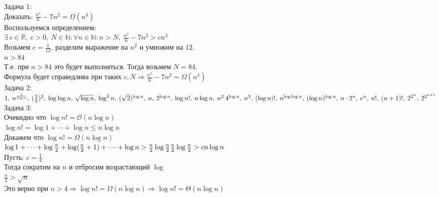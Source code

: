 \documentclass[a4paper, 11pt]{article}
\begin{document}
\quad\quad Задача 1:\\
Доказать: $\frac{n^3}{6} - 7n^2 = \Omega(n^3)$\\
Воспользуемся определением:\\
$\exists\medspace c \in \mathbb{R},\medspace c > 0,\medspace N \in \mathbb{N}: \forall n \in \mathbb{N}: n > N,\medspace\frac{n^3}{6} - 7n^2 > cn^3$\\
Возьмем $c = \frac{1}{12}$, разделим выражение на $n^2$ и умножим на $12$.\\
$n > 84$\\
Т.е. при $n > 84$ это будет выполняться. Тогда возьмем $N = 84$.\\
Формула будет справедлива при таких $c, N \Rightarrow \frac{n^3}{6} - 7n^2 = \Omega(n^3)$ 
\\

\quad\quad Задача 2:\\
$
1, \medspace n^\frac{1}{\log{n}}, \medspace (\frac{3}{2})^2, \medspace \log{\log{n}}, \medspace \sqrt{\log{n}}, \medspace \log^2{n}, \medspace (\sqrt{2})^{\log{n}}, \medspace n, \medspace 2^{\log{n}}, \medspace \log{n!}, \medspace n\log{n}, \medspace n^2\\ \medspace 4^{\log{n}}, \medspace n^3, \medspace (\log{n})!, \medspace n^{\log{\log{n}}}, \medspace (\log{n})^{\log{n}}, \medspace n\cdot2^n, \medspace e^n, \medspace n!, \medspace (n + 1)!, \medspace 2^{2^n}, \medspace 2^{2^{n + 1}}
$
\\

\quad\quad Задача 3:\\
Очевидно что $\log{n!} = \mathcal{O}(n\log{n})$\\
$\log{n!} = \log{1} + \cdots + \log{n} \leqslant n\log{n}$\\
Докажем что $\log{n!} = \Omega(n\log{n})$\\
$\log{1} + \cdots + \log{\frac{n}{2}} + \log(\frac{n}{2} + 1) + \cdots +
\log{n} > \frac{n}{2}\log{\frac{n}{2}}\\
\frac{n}{2}\log{\frac{n}{2}} > cn\log{n}$\\
Пусть: $c = \frac{1}{4}$\\
Тогда сократим на $n$ и отбросим возрастающий $\log$\\$\frac{n}{2} > \sqrt{n}$\\
Это верно при $n > 4 \Rightarrow \log{n!} = \Omega(n\log{n}) \Rightarrow
\log{n!} = \Theta(n\log{n})$\\
\end{document}

